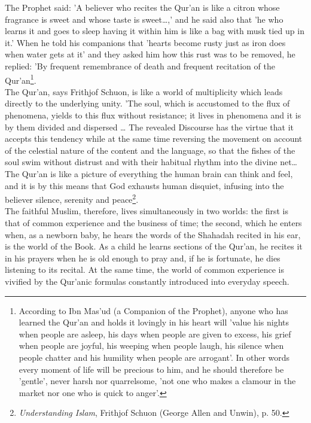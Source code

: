 \documentclass[11pt, b5paper, twoside]{book}
\begin{document}
The Prophet said: 'A believer who recites the Qur'an is like a citron whose fragrance is sweet and 
whose taste is sweet\ldots{},' and he said also that 'he who learns it and goes to sleep having it within 
him is like a bag with musk tied up in it.' When he told his companions that 'hearts become rusty 
just as iron does when water gets at it' and they asked him how this rust was to be removed, he 
replied: 'By frequent remembrance of death and frequent recitation of the Qur'an\footnote{According to Ibn Mas'ud (a Companion of the Prophet), anyone who has learned the Qur'an and holds 
it lovingly in his heart will 'value his nights when people are asleep, his days when people are 
given to excess, his grief when people are joyful, his weeping when people laugh, his silence when 
people chatter and his humility when people are arrogant'. In other words every moment of life will 
be precious to him, and he should therefore be 'gentle', never harsh nor quarrelsome, 'not one who 
makes a clamour in the market nor one who is quick to anger'.}.\\

The Qur'an, says Frithjof Schuon, is like a world of multiplicity which leads directly to the 
underlying unity. 'The soul, which is accustomed to the flux of phenomena, yields to this flux 
without resistance; it lives in phenomena and it is by them divided and dispersed \ldots{} The revealed 
Discourse has the virtue that it accepts this tendency while at the same time reversing the movement 
on account of the celestial nature of the content and the language, so that the fishes of the soul 
swim without distrust and with their habitual rhythm into the divine net\ldots{} The Qur'an is like a 
picture of everything the human brain can think and feel, and it is by this means that God exhausts 
human disquiet, infusing into the believer silence, serenity and peace\footnote{\emph{Understanding Islam}, Frithjof Schuon (George Allen and Unwin), p. 50.}.\\

The faithful Muslim, therefore, lives simultaneously in two worlds: the first is that of common 
experience and the business of time; the second, which he enters when, as a newborn baby, he hears 
the words of the Shahadah recited in his ear, is the world of the Book. As a child he learns sections 
of the Qur'an, he recites it in his prayers when he is old enough to pray and, if he is fortunate, he 
dies listening to its recital. At the same time, the world of common experience is vivified by the 
Qur'anic formulas constantly introduced into everyday speech. \\
\end{document}
